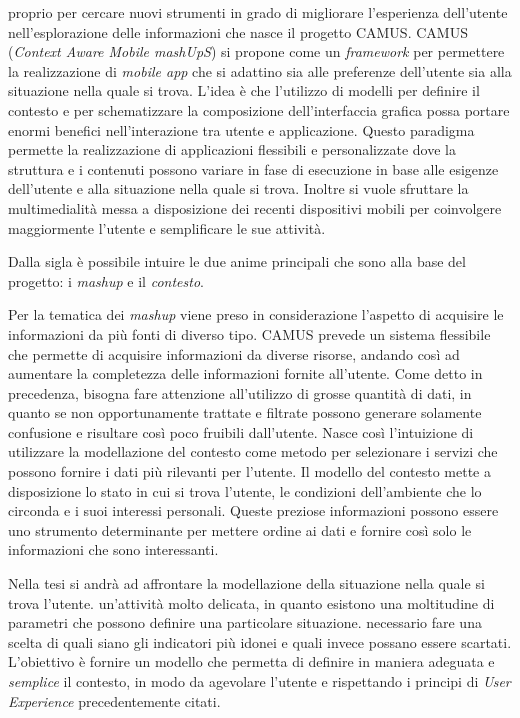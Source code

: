 \upe proprio per cercare nuovi strumenti in grado di migliorare l'esperienza dell'u\-ten\-te nell'esplorazione delle informazioni che nasce il progetto CAMUS. CAMUS (\emph{Context Aware Mobile mashUpS}) si propone come un \emph{framework} per permettere la realizzazione di \emph{mobile app} che si adattino sia alle preferenze dell'utente sia alla situazione nella quale si trova. L'idea è che l'utilizzo di modelli per definire il contesto e per schematizzare la composizione dell'interfaccia grafica possa portare enormi benefici nell'interazione tra utente e applicazione.
Questo paradigma permette la realizzazione di applicazioni flessibili e personalizzate dove la struttura e i contenuti possono variare in fase di esecuzione in base alle esigenze dell'utente e alla situazione nella quale si trova. Inoltre si vuole sfruttare la multimedialità messa a disposizione dei recenti dispositivi mobili per coinvolgere maggiormente l'utente e semplificare le sue attività.

Dalla sigla è possibile intuire le due anime principali che sono alla base del progetto: i \emph{mashup} e il \emph{contesto}.

Per la tematica dei \emph{mashup} viene preso in considerazione l'aspetto di acquisire le informazioni da più fonti di diverso tipo. CAMUS prevede un sistema flessibile che permette di acquisire informazioni da diverse risorse, andando così ad aumentare la completezza delle informazioni fornite all'utente. Come detto in precedenza, bisogna fare attenzione all'utilizzo di grosse quantità di dati, in quanto se non opportunamente trattate e filtrate possono generare solamente confusione e risultare così poco fruibili dall'utente. Nasce così l'intuizione di utilizzare la modellazione del contesto come metodo per selezionare i servizi che possono fornire i dati più rilevanti per l'utente. Il modello del contesto mette a disposizione lo stato in cui si trova l'utente, le condizioni dell'ambiente che lo circonda e i suoi interessi personali. Queste preziose informazioni possono essere uno strumento determinante per mettere ordine ai dati e fornire così solo le informazioni che sono interessanti.

Nella tesi si andrà ad affrontare la modellazione della situazione nella quale si trova l'utente. \upe un'attività molto delicata, in quanto esistono una moltitudine di parametri che possono definire una particolare situazione. \upe necessario fare una scelta di quali siano gli indicatori più idonei e quali invece possano essere scartati. L'obiettivo è fornire un modello che permetta di definire in maniera adeguata e \emph{semplice} il contesto, in modo da agevolare l'utente e rispettando i principi di \emph{User Experience} precedentemente citati.

